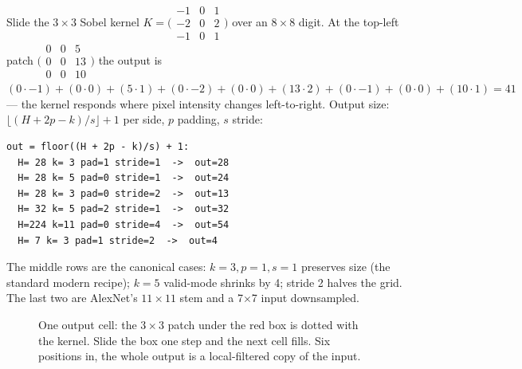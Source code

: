 \begin{example}
\label{ex:handconv}
Slide the $3\times3$ Sobel kernel
$K=\bigl(\begin{smallmatrix}-1&0&1\\-2&0&2\\-1&0&1\end{smallmatrix}\bigr)$
over an $8\times8$ digit. At the top-left patch
$\bigl(\begin{smallmatrix}0&0&5\\0&0&13\\0&0&10\end{smallmatrix}\bigr)$
the output is
$(0\cdot-1)+(0\cdot0)+(5\cdot1)+(0\cdot-2)+(0\cdot0)+(13\cdot2)+(0\cdot-1)+(0\cdot0)+(10\cdot1)=41$ ---
the kernel responds where pixel intensity changes left-to-right.
Output size: $\lfloor(H+2p-k)/s\rfloor+1$ per side, $p$ padding,
$s$ stride:

\begin{verbatim}
out = floor((H + 2p - k)/s) + 1:
  H= 28 k= 3 pad=1 stride=1  ->  out=28
  H= 28 k= 5 pad=0 stride=1  ->  out=24
  H= 28 k= 3 pad=0 stride=2  ->  out=13
  H= 32 k= 5 pad=2 stride=1  ->  out=32
  H=224 k=11 pad=0 stride=4  ->  out=54
  H= 7 k= 3 pad=1 stride=2  ->  out=4
\end{verbatim}

The middle rows are the canonical cases: $k{=}3,p{=}1,s{=}1$ preserves
size (the standard modern recipe); $k{=}5$ valid-mode shrinks by 4;
stride 2 halves the grid. The last two are AlexNet's $11\times11$
stem and a 7$\times$7 input downsampled.
\end{example}



\begin{figure}[htbp]
\centering
{}
\caption{One output cell: the $3\times3$ patch under the red box is
dotted with the kernel. Slide the box one step and the next cell
fills. Six positions in, the whole output is a local-filtered copy of
the input.}
\label{fig:convslide}
\end{figure}

